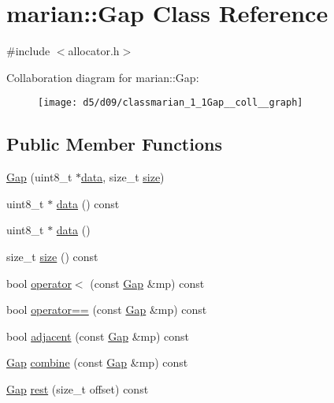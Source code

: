 \hypertarget{classmarian_1_1Gap}{}\section{marian\+:\+:Gap Class Reference}
\label{classmarian_1_1Gap}


{\ttfamily \#include $<$allocator.\+h$>$}



Collaboration diagram for marian\+:\+:Gap\+:
\nopagebreak
\begin{figure}[H]
\begin{center}
\leavevmode
\texttt{[image: d5/d09/classmarian\_1\_1Gap\_\_coll\_\_graph]}
\end{center}
\end{figure}
\subsection*{Public Member Functions}
\begin{DoxyCompactItemize}
\item 
\hyperlink{classmarian_1_1Gap_aa476965d468f8b9104bb3dcb7c7c6aa2}{Gap} (uint8\+\_\+t $\ast$\hyperlink{classmarian_1_1Gap_acbc9a4d43af0bbd860c4dddd01fa6bca}{data}, size\+\_\+t \hyperlink{classmarian_1_1Gap_a7f8a530a91cd2b24a39d54eb18e05d19}{size})
\item 
uint8\+\_\+t $\ast$ \hyperlink{classmarian_1_1Gap_acbc9a4d43af0bbd860c4dddd01fa6bca}{data} () const 
\item 
uint8\+\_\+t $\ast$ \hyperlink{classmarian_1_1Gap_ad70e63fa5e2cf687ff882cdfc9a78f7a}{data} ()
\item 
size\+\_\+t \hyperlink{classmarian_1_1Gap_a7f8a530a91cd2b24a39d54eb18e05d19}{size} () const 
\item 
bool \hyperlink{classmarian_1_1Gap_a796dcbf92563af49784a37248a6af154}{operator$<$} (const \hyperlink{classmarian_1_1Gap}{Gap} \&mp) const 
\item 
bool \hyperlink{classmarian_1_1Gap_ad906f99514af8651c33410f283e834a0}{operator==} (const \hyperlink{classmarian_1_1Gap}{Gap} \&mp) const 
\item 
bool \hyperlink{classmarian_1_1Gap_a29b456bc20296682ab77f16b185acbd3}{adjacent} (const \hyperlink{classmarian_1_1Gap}{Gap} \&mp) const 
\item 
\hyperlink{classmarian_1_1Gap}{Gap} \hyperlink{classmarian_1_1Gap_abf7f297ffce3fb79405d73f98a26daf9}{combine} (const \hyperlink{classmarian_1_1Gap}{Gap} \&mp) const 
\item 
\hyperlink{classmarian_1_1Gap}{Gap} \hyperlink{classmarian_1_1Gap_ab765bb25e76baf4988394892b2610327}{rest} (size\+\_\+t offset) const 
\end{DoxyCompactItemize}
